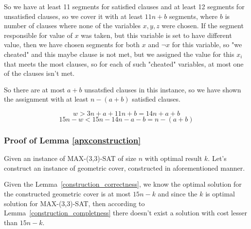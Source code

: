 So we have at least 11 segments for satisfied clauses
and at least 12 segments
for unsatisfied clauses, so we cover it with 
at least $11n + b$ segments, where $b$ is number of clauses
where none of the variables $x, y, z$ were chosen.
If the segment responsible for value of $x$ was taken,
but this variable is set to have different value,
then we have chosen segments for both $x$ and $\neg x$ for this variable,
so "we cheated" and this maybe clause is not met,
but we assigned the value for this $x_i$ that meets
the most clauses, so for each of such "cheated" variables,
at most one of the clauses isn't met.

So there are at most $a+b$ unsatsfied clauses in this instance,
so we have shown the assignment with at least  $n-(a+b)$ satisfied clauses.

$$w > 3n + a + 11n + b = 14n + a + b$$
$$15n - w  < 15n - 14 n - a - b = n - (a+b)$$

\subsubsection{Proof of Lemma \ref{apxconstruction}}
Given an instance of MAX-(3,3)-SAT of size $n$
with optimal result $k$.
Let's construct an instance of geometric cover,
constructed in aforementioned manner.

Given the Lemma~\ref{construction_correctness}, we know
the optimal solution for the constructed geometric cover is
at most $15n - k$ and since the $k$ is optimal solution
for MAX-(3,3)-SAT, then according to Lemma~\ref{construction_completness}
there doesn't exist a solution with cost lesser than $15n - k$.
